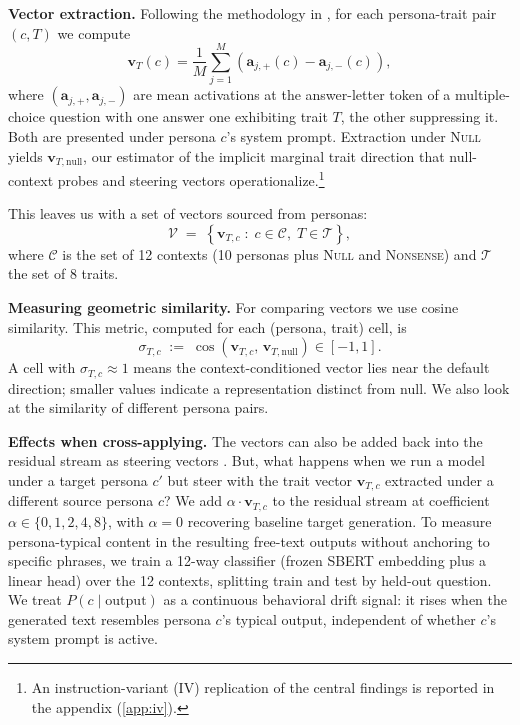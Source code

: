 \documentclass{article}
\theoremstyle{plain}
\theoremstyle{definition}
\theoremstyle{remark}
\begin{document}
\textbf{Vector extraction.} Following the methodology in \citet{rimsky2024steering}, for each persona-trait pair $(c, T)$ we compute
\begin{equation}
    \mathbf{v}_{T}(c) = \frac{1}{M} \sum_{j=1}^{M}
        \left( \mathbf{a}_{j,+}(c) - \mathbf{a}_{j,-}(c) \right),
    \label{eq:caa}
\end{equation}
where $(\mathbf{a}_{j,+}, \mathbf{a}_{j,-})$ are mean activations at the answer-letter token of a multiple-choice question with one answer one exhibiting trait $T$, the other suppressing it. Both are presented under persona $c$'s system prompt. Extraction under \textsc{Null} yields $\mathbf{v}_{T,\text{null}}$, our estimator of the implicit marginal trait direction that null-context probes and steering vectors operationalize.\footnote{An instruction-variant (IV) replication of the central findings is reported in the appendix (\cref{app:iv}).}
 
This leaves us with a set of vectors sourced from personas:
\begin{equation}
    \mathcal{V} \;=\; \left\{ \mathbf{v}_{T,c} \;:\; c \in \mathcal{C},\; T \in \mathcal{T} \right\},
\end{equation}
where $\mathcal{C}$ is the set of 12 contexts (10 personas plus \textsc{Null} and \textsc{Nonsense}) and $\mathcal{T}$ the set of 8 traits.
 
\textbf{Measuring geometric similarity.} For comparing vectors we use cosine similarity. This metric, computed for each (persona, trait) cell, is
\begin{equation}
    \sigma_{T,c} \;:=\; \cos\!\left( \mathbf{v}_{T,c},\, \mathbf{v}_{T,\text{null}} \right) \in [-1, 1].
    \label{eq:sigma}
\end{equation}
A cell with $\sigma_{T,c} \approx 1$ means the context-conditioned vector lies near the default direction; smaller values indicate a representation distinct from null. We also look at the similarity of different persona pairs. 
 
\textbf{Effects when cross-applying.} The vectors can also be added back into the residual stream as steering vectors \citep{turner2024activation, rimsky2024steering}. But, what happens when we run a model under a target persona $c'$ but steer with the trait vector $\mathbf{v}_{T,c}$ extracted under a different source persona $c$? We add $\alpha \cdot \mathbf{v}_{T,c}$ to the residual stream at coefficient $\alpha \in \{0, 1, 2, 4, 8\}$, with $\alpha = 0$ recovering baseline target generation. To measure persona-typical content in the resulting free-text outputs without anchoring to specific phrases, we train a 12-way classifier (frozen SBERT embedding plus a linear head) over the 12 contexts, splitting train and test by held-out question. We treat $P(c \mid \text{output})$ as a continuous behavioral drift signal: it rises when the generated text resembles persona $c$'s typical output, independent of whether $c$'s system prompt is active. 
 
\end{document}
